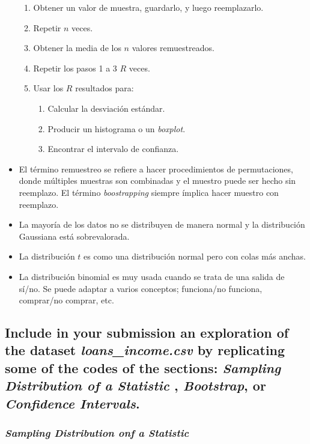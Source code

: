 \documentclass[12pt]{article}\usepackage[]{graphicx}\usepackage[]{xcolor}
\begin{document}
\begin{itemize}
\begin{enumerate}
          \item Obtener un valor de muestra, guardarlo, y luego reemplazarlo.
          \item Repetir $n$ veces.
          \item Obtener la media de los $n$ valores remuestreados.
          \item Repetir los pasos 1 a 3 $R$ veces. 
          \item Usar los $R$ resultados para:
                \begin{enumerate}
                  \item Calcular la desviación estándar.
                  \item Producir un histograma o un \textit{boxplot}.
                  \item Encontrar el intervalo de confianza.
                \end{enumerate}
        \end{enumerate}
  \item El término remuestreo se refiere a hacer procedimientos de permutaciones, donde múltiples muestras son combinadas y el muestro puede ser hecho sin reemplazo. El término \textit{boostrapping} siempre ímplica hacer muestro con reemplazo.
  \item La mayoría de los datos no se distribuyen de manera normal y la distribución Gaussiana está sobrevalorada.
  \item La distribución $t$ es como una distribución normal pero con colas más anchas.
  \item La distribución binomial es muy usada cuando se trata de una salida de sí/no. Se puede adaptar a varios conceptos; funciona/no funciona, comprar/no comprar, etc.
\end{itemize}

\subsection{Include in your submission an exploration of the dataset \textit{loans\_income.csv} by replicating some of the codes of the sections: \textit{Sampling Distribution of a Statistic} , \textit{Bootstrap}, or \textit{Confidence Intervals}.}

\subsubsection{\textit{Sampling Distribution onf a Statistic}}
\end{document}
